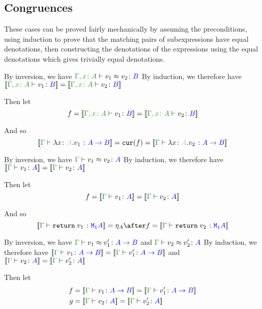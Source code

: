 \documentclass{report}
\begin{document}
\subsection{Congruences}
These cases can be proved fairly mechanically by assuming the preconditions, using induction to prove that the matching pairs of subexpressions have equal denotations, then constructing the denotations of the expressions using the equal denotations which gives trivially equal denotations.

    By inversion, we have $\berelation{\gax}{v_1}{v_2}{B}$
    By induction, we therefore have $\deno{\typerelation{\gax}{v_1}{B}} = \deno{\typerelation{\gax}{v_2}{B}}$

    Then let
    \begin{equation}
        f = \deno{\typerelation{\gax}{v_1}{B}} = \deno{\typerelation{\gax}{v_2}{B}}
    \end{equation}

    And so
    \begin{equation}
        \deno{\gtyperelation{\lam{x}{A}{v_1}}{\ab}} = \cur{f} = \deno{\gtyperelation{\lam{x}{A}{v_2}}{\ab}}
    \end{equation}


By inversion, we have $\gberelation{v_1}{v_2}{A}$
By induction, we therefore have $\deno{\gtyperelation{v_1}{A}} = \deno{\gtyperelation{v_2}{A}}$

Then let
\begin{equation}
    f = \deno{\gtyperelation{v_1}{A}} = \deno{\gtyperelation{v_2}{A}}
\end{equation}

And so
\begin{equation}
    \deno{\gtyperelation{\return{v_1}}{\M{\1}{A}}} = \point{A}\after f = \deno{\gtyperelation{\return{v_2}}{\M{\1}{A}}}
\end{equation}


By inversion, we have $\gberelation{v_1}{v_1'}{\ab}$ and $\gberelation{v_2}{v_2'}{A}$
By induction, we therefore have $\deno{\gtyperelation{v_1}{\ab}}= \deno{\gtyperelation{v_1'}{\ab}}$ and $\deno{\gtyperelation{v_2}{A}} = \deno{\gtyperelation{v_2'}{A}}$

Then let
\begin{align*}
    f &{}= \deno{\gtyperelation{v_1}{\ab}} = \deno{\gtyperelation{v_1'}{\ab}}\\
    g &{}= \deno{\gtyperelation{v_2}{A}} = \deno{\gtyperelation{v_2'}{A}}
\end{align*}
\end{document}
